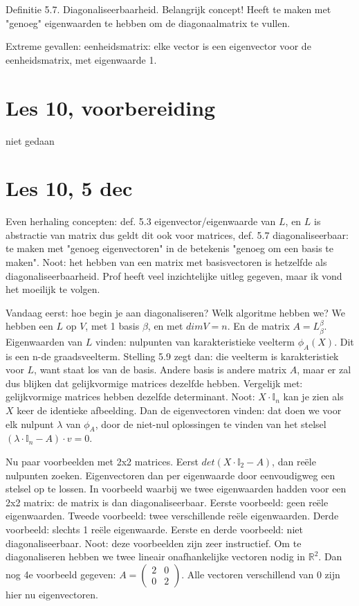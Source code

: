 \documentclass{article}
\begin{document}
Definitie 5.7. Diagonaliseerbaarheid. Belangrijk concept! Heeft te maken met "genoeg" eigenwaarden te hebben om de diagonaalmatrix te vullen. 

Extreme gevallen: eenheidsmatrix: elke vector is een eigenvector voor de eenheidsmatrix, met eigenwaarde 1. 


\section*{Les 10, voorbereiding}
niet gedaan

\section*{Les 10, 5 dec}

Even herhaling concepten: def. 5.3 eigenvector/eigenwaarde van $L$, en $L$ is abstractie van matrix dus geldt dit ook voor matrices, def. 5.7 diagonaliseerbaar: te maken met "genoeg eigenvectoren" in de betekenis "genoeg om een basis te maken". Noot: het hebben van een matrix met basisvectoren is hetzelfde als diagonaliseerbaarheid. Prof heeft veel inzichtelijke uitleg gegeven, maar ik vond het moeilijk te volgen. 

Vandaag eerst: hoe begin je aan diagonaliseren? Welk algoritme hebben we? We hebben een $L$ op $V$, met 1 basis $\beta$, en met $dim V=n$. En de matrix $A = L_{\beta}^{\beta}$. Eigenwaarden van $L$ vinden: nulpunten van karakteristieke veelterm $\phi_A(X)$. Dit is een n-de graadsveelterm. Stelling 5.9 zegt dan: die veelterm is karakteristiek voor $L$, want staat los van de basis. Andere basis is andere matrix $A$, maar er zal dus blijken dat gelijkvormige matrices dezelfde hebben. Vergelijk met: gelijkvormige matrices hebben dezelfde determinant. Noot: $X \cdot \mathbb{I}_n$ kan je zien als $X$ keer de identieke afbeelding. 
Dan de eigenvectoren vinden: dat doen we voor elk nulpunt $\lambda$ van $\phi_A$, door de niet-nul oplossingen te vinden van het stelsel $(\lambda \cdot \mathbb{I}_n -A) \cdot v = 0$. 

Nu paar voorbeelden met 2x2 matrices. Eerst $det( X \cdot \mathbb{I}_2 - A)$, dan re\"ele nulpunten zoeken. Eigenvectoren dan per eigenwaarde door eenvoudigweg een stelsel op te lossen. In voorbeeld waarbij we twee eigenwaarden hadden voor een 2x2 matrix: de matrix is dan diagonaliseerbaar. Eerste voorbeeld: geen re\"ele eigenwaarden. Tweede voorbeeld: twee verschillende re\"ele eigenwaarden. Derde voorbeeld: slechts 1 re\"ele eigenwaarde. Eerste en derde voorbeeld: niet diagonaliseerbaar. 
Noot: deze voorbeelden zijn zeer instructief. Om te diagonaliseren hebben we twee lineair onafhankelijke vectoren nodig in $\mathbb{R}^2$. 
Dan nog 4e voorbeeld gegeven: $A = \begin{pmatrix}
    2 & 0 \\ 0 & 2
\end{pmatrix}$. Alle vectoren verschillend van $0$ zijn hier nu eigenvectoren. 
\end{document}
